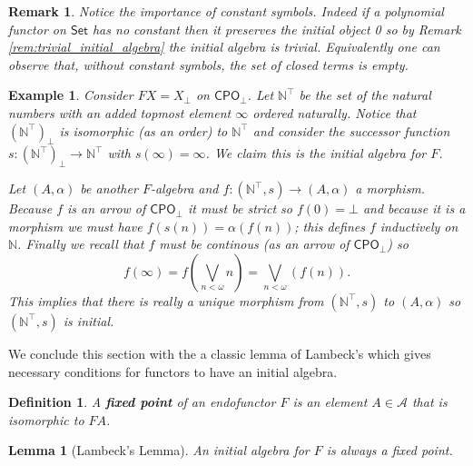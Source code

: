 \documentclass[letterpaper, 11pt, oneside]{memoir}
\theoremstyle{myteo}
\newtheorem{lemma}[theorem]{Lemma}
\newtheorem{definition}[theorem]{Definition}
\newtheorem{example}[theorem]{Example}
\newtheorem{remark}[theorem]{Remark}
\numberwithin{equation}{section}
\newcommand{\Set}{\textsf{Set}}
\newcommand{\CPO}{\textsf{CPO}}
\newcommand{\N}{\mathbb{N}}
\begin{document}
\begin{remark}
  Notice the importance of constant symbols.
  Indeed if a polynomial functor on \(\Set\) has no constant then it preserves the initial object 0 so by Remark \ref{rem:trivial_initial_algebra} the initial algebra is trivial.
 Equivalently one can observe that, without constant symbols, the set of closed terms is empty.
\end{remark}

\begin{example}
  Consider \(FX = X_\bot\) on \(\CPO_\bot\).
  Let \(\mathbb{N}^\top\) be the set of the natural numbers with an added topmost element \(\infty\) ordered naturally.
  Notice that \((\mathbb{N}^\top)_\bot\) is isomorphic (as an order) to \(\mathbb{N}^\top\) and consider the successor function \(s \colon (\mathbb{N}^\top)_\bot \to \mathbb{N}^\top\) with \(s(\infty) = \infty\).
  We claim this is the initial algebra for \(F\).

  Let \((A, \alpha)\) be another \(F\)-algebra and \(f \colon (\N^\top, s) \to (A, \alpha)\) a morphism.
  Because \(f\) is an arrow of \(\CPO_\bot\) it must be strict so \(f(0) = \bot\) and because it is a morphism we must have \(f(s(n)) = \alpha(f(n))\); this defines \(f\) inductively on \(\N\).
  Finally we recall that \(f\) must be continous (as an arrow of \(\CPO_\bot\)) so
  \begin{equation*}
    f(\infty) = f \left(\bigvee_{n < \omega} n\right) = \bigvee_{n < \omega}(f(n)).
  \end{equation*}
  This implies that there is really a unique morphism from \((\N^\top, s)\) to \((A, \alpha)\) so \((\N^\top, s)\) is initial.
\end{example}

We conclude this section with the a classic lemma of Lambeck's which gives necessary conditions for functors to have an initial algebra.

\begin{definition}
  A \textbf{fixed point} of an endofunctor \(F\) is an element \(A \in \mathscr{A}\) that is isomorphic to \(FA\).
\end{definition}

\begin{lemma}[Lambeck's Lemma]
  \label{lemma:lambeck}
  An initial algebra for \(F\) is always a fixed point.
\end{lemma}
\end{document}
